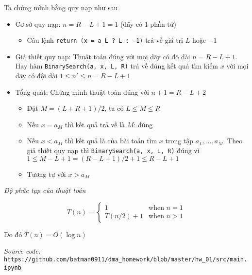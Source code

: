 Ta chứng mình bằng quy nạp như sau 
\begin{itemize}
    \item Cơ sở quy nạp: $n = R - L + 1 = 1$ (dãy có 1 phần tử)
    \begin{itemize}
        \item Câu lệnh \lstinline{return (x = a_L ? L : -1)} trả về giá trị $L$ hoặc $-1$
    \end{itemize}
    
    \item Giả thiết quy nạp: Thuật toán đúng với mọi dãy có độ dài $n = R-L+1$.
    Hay hàm \lstinline{BinarySearch(a, x, L, R)} trả về đúng kết quả tìm kiếm $x$ với mọi dãy
    có đội dài $1 \leq n' \leq n = R - L + 1$

    \item Tổng quát: Chứng minh thuật toán đúng với $n+1 = R-L+2$
    \begin{itemize}
        \item Đặt $M=(L+R+1)/2$, ta có $L \leq M \leq R$
        \item Nếu $x = a_M$ thì kết quả trả về là $M$: đúng
        \item Nếu $x < a_M$ thì kết quả là của bài toán tìm $x$ trong tập $a_L, ... , a_M$.
        Theo giả thiết quy nạp thì \lstinline{BinarySearch(a, x, L, R)} đúng vì 
        $1 \leq M - L + 1 = (R - L + 1)/2 + 1 \leq R - L + 1$
        \item Tương tự với $x > a_M$
    \end{itemize}
\end{itemize}

\textit{Độ phức tạp của thuật toán}

\begin{equation*}
    T(n) = 
    \begin{cases}
        1 & \text{when } n = 1 \\
        T(n/2) + 1 & \text{when } n > 1
    \end{cases}
\end{equation*}

Do đó $T(n) = O(\log n)$

\textit{Source code: } \lstinline{https://github.com/batman0911/dma_homework/blob/master/hw_01/src/main.ipynb}




